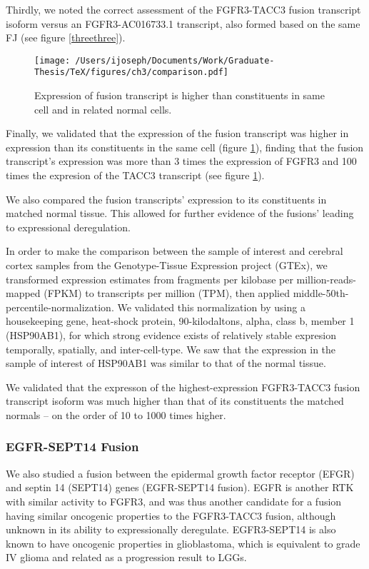 Thirdly, we noted the correct assessment of the FGFR3-TACC3 fusion transcript isoform versus an FGFR3-AC016733.1 transcript, also formed based on the same FJ (see figure \ref{threethree}).


\begin{figure}
  \centering \texttt{[image: /Users/ijoseph/Documents/Work/Graduate-Thesis/TeX/figures/ch3/comparison.pdf]}
  \caption{Expression of fusion transcript is higher than constituents in same cell and in related normal cells.}\label{threefour}
\end{figure}


Finally, we validated that the expression of the fusion transcript was higher in expression than its constituents in the same cell (figure \ref{threefour}), finding that the fusion transcript's expression was more than 3 times the expression of FGFR3 and 100 times the expresion of the TACC3 transcript (see figure \ref{threefour}).

We also compared the fusion transcripts' expression to its constituents in matched normal tissue. This allowed for further evidence of the fusions' leading to expressional deregulation.

In order to make the comparison between the sample of interest and cerebral cortex samples from the Genotype-Tissue Expression project (GTEx)\cite{lonsdale_genotype-tissue_2013}, we transformed expression estimates from fragments per kilobase per million-reads-mapped (FPKM) to transcripts per million (TPM), then applied middle-50th-percentile-normalization\cite{_what_2014}. We validated this normalization by using a housekeeping gene, heat-shock protein, 90-kilodaltons, alpha, class b, member 1 (HSP90AB1), for which strong evidence exists of relatively stable expresion temporally, spatially, and inter-cell-type. We saw that the expression in the sample of interest of HSP90AB1 was similar to that of the normal tissue.

We validated that the expresson of the highest-expression FGFR3-TACC3 fusion transcript isoform was much higher than that of its constituents the matched normals -- on the order of 10 to 1000 times higher.

\subsubsection{EGFR-SEPT14 Fusion}

We also studied a fusion between the epidermal growth factor receptor (EFGR) and septin 14 (SEPT14) genes (EGFR-SEPT14 fusion). EGFR is another RTK with similar activity to FGFR3, and was thus another candidate for a fusion having similar oncogenic properties to the FGFR3-TACC3 fusion, although unknown in its ability to expressionally deregulate. EGFR3-SEPT14 is also known to have oncogenic properties in glioblastoma, which is equivalent to grade IV glioma and related as a progression result to LGGs\cite{_omim_2016-1}. 

